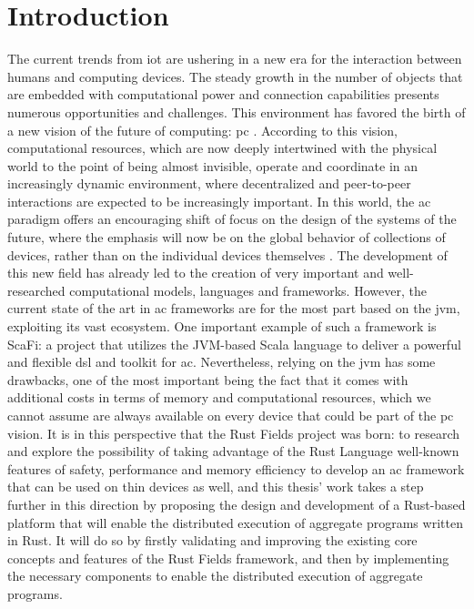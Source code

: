 
\chapter{Introduction}
\label{chap:introduction}
The current trends from \ac{iot} are ushering in a new era for the interaction between humans and computing devices. The steady growth in the number of objects that are embedded with computational power
and connection capabilities presents numerous opportunities and challenges. This environment has favored the birth of a new vision of the future of computing: \ac{pc} \cite{satyanarayanan2001pervasive}.
According to this vision, computational resources, which are now deeply intertwined with the physical world to the point of being almost invisible, operate and coordinate in an increasingly
dynamic environment, where decentralized and peer-to-peer interactions are expected to be increasingly important. In this world, the \ac{ac} paradigm offers an encouraging shift of focus on the design
of the systems of the future, where the emphasis will now be on the global behavior of collections of devices, rather than on the individual devices themselves \cite{7274429}.
The development of this new field has already led to the creation of very important and well-researched computational models, languages and frameworks. However, the current state of the art in \ac{ac}
frameworks are for the most part based on the \ac{jvm}, exploiting its vast ecosystem. One important example of such a framework is ScaFi: a project that utilizes the JVM-based Scala language
to deliver a powerful and flexible \ac{dsl} and toolkit for \ac{ac}. Nevertheless, relying on the \ac{jvm} has some drawbacks, one of the most important being the fact that it comes with additional costs in terms
of memory and computational resources, which we cannot assume are always available on every device that could be part of the \ac{pc} vision. It is in this perspective that the Rust Fields project was born: to
research and explore the possibility of taking advantage of the Rust Language well-known features of safety, performance and memory efficiency to develop an \ac{ac} framework that can be used on thin devices as well,
and this thesis' work takes a step further in this direction by proposing the design and development of a Rust-based platform that will enable the distributed execution of aggregate programs written in Rust.
It will do so by firstly validating and improving the existing core concepts and features of the Rust Fields framework, and then by implementing the necessary components to enable the distributed execution of aggregate programs.

